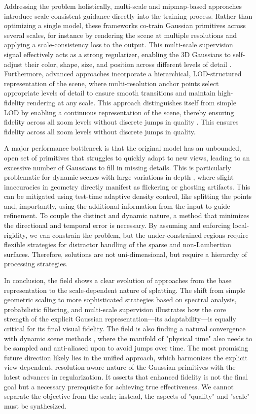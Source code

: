 \documentclass[11pt,a4paper]{article}
\begin{document}
Addressing the problem holistically, multi-scale and mipmap-based approaches introduce scale-consistent guidance directly into the training process. Rather than optimizing a single model, these frameworks co-train Gaussian primitives across several scales, for instance by rendering the scene at multiple resolutions and applying a scale-consistency loss to the output. This multi-scale supervision signal effectively acts as a strong regularizer, enabling the 3D Gaussians to self-adjust their color, shape, size, and position across different levels of detail \cite{arxiv:2403.17898v1}. Furthermore, advanced approaches incorporate a hierarchical, LOD-structured representation of the scene, where multi-resolution anchor points select appropriate levels of detail to ensure smooth transitions and maintain high-fidelity rendering at any scale. This approach distinguishes itself from simple LOD by enabling a continuous representation of the scene, thereby ensuring fidelity across all zoom levels without discrete jumps in quality \cite{arxiv:2403.17898v1}. This ensures fidelity across all zoom levels without discrete jumps in quality.

A major performance bottleneck is that the original model has an unbounded, open set of primitives that struggles to quickly adapt to new views, leading to an excessive number of Gaussians to fill in missing details. This is particularly problematic for dynamic scenes with large variations in depth \cite{arxiv:2309.13101v2}, where slight inaccuracies in geometry directly manifest as flickering or ghosting artifacts. This can be mitigated using test-time adaptive density control, like splitting the points and, importantly, using the additional information from the input to guide refinement. To couple the distinct and dynamic nature, a method that minimizes the directional and temporal error is necessary. By assuming and enforcing local-rigidity, we can constrain the problem, but the under-constrained regions require flexible strategies for distractor handling of the sparse and non-Lambertian surfaces. Therefore, solutions are not uni-dimensional, but require a hierarchy of processing strategies.

In conclusion, the field shows a clear evolution of approaches from the base representation to the scale-dependent nature of splatting. The shift from simple geometric scaling to more sophisticated strategies based on spectral analysis, probabilistic filtering, and multi-scale supervision illustrates how the core strength of the explicit Gaussian representation---its adaptability---is equally critical for its final visual fidelity. The field is also finding a natural convergence with dynamic scene methods \cite{arxiv:2308.09713v1}, where the manifold of "physical time" also needs to be sampled and anti-aliased upon to avoid jumps over time. The most promising future direction likely lies in the unified approach, which harmonizes the explicit view-dependent, resolution-aware nature of the Gaussian primitives with the latest advances in regularization. It asserts that enhanced fidelity is not the final goal but a necessary prerequisite for achieving true effectiveness. We cannot separate the objective from the scale; instead, the aspects of "quality" and "scale" must be synthesized.
\end{document}
